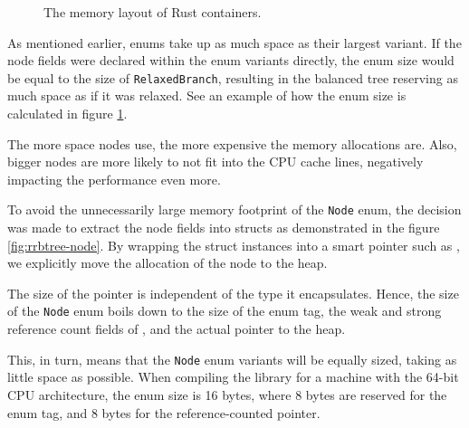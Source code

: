 \begin{figure}[!ht]

    \caption{The memory layout of Rust containers.}
    \label{fig:memory-layout-of-rust-containers}
\end{figure}

As mentioned earlier, enums take up as much space as their largest variant. If the node fields were declared within the enum variants directly, the enum size would be equal to the size of \texttt{RelaxedBranch}, resulting in the balanced tree reserving as much space as if it was relaxed. See an example of how the enum size is calculated in figure \ref{fig:memory-layout-of-rust-containers}.

The more space nodes use, the more expensive the memory allocations are. Also, bigger nodes are more likely to not fit into the CPU cache lines, negatively impacting the performance even more.

To avoid the unnecessarily large memory footprint of the \texttt{Node} enum, the decision was made to extract the node fields into structs as demonstrated in the figure \ref{fig:rrbtree-node}. By wrapping the struct instances into a smart pointer such as \rc{}, we explicitly move the allocation of the node to the heap.

The size of the \rc{} pointer is independent of the type it encapsulates. Hence, the size of the \texttt{Node} enum boils down to the size of the enum tag, the weak and strong reference count fields of \rc{}, and the actual pointer to the heap.

This, in turn, means that the \texttt{Node} enum variants will be equally sized, taking as little space as possible. When compiling the library for a machine with the 64-bit CPU architecture, the enum size is 16 bytes, where 8 bytes are reserved for the enum tag, and 8 bytes for the reference-counted pointer.

